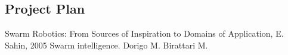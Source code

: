 \documentclass[titlepage,hidelinks,10pt]{article}
\begin{document}
\begin{multicols*}{2}
\section{Project Plan}
\begin{thebibliography}{1}
 Swarm Robotics: From Sources of
Inspiration to Domains of Application, E. Sahin, 2005
 Swarm intelligence. Dorigo M. Birattari M.
\end{thebibliography}

\end{multicols*}
\end{document}
